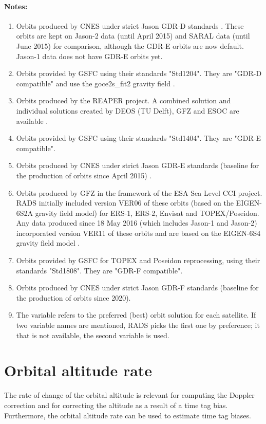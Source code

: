 \documentclass[a4paper,11pt,openany,natbib,nomargin]{thesis}
\newenvironment{notes}[1][Notes:]{\FloatBarrier\paragraph{#1}\begin{enumerate}}{\end{enumerate}}
\begin{document}
\begin{notes}
\item Orbits produced by CNES under strict Jason GDR-D standards \citep{ids2011}. These orbits are kept on Jason-2 data (until April 2015) and SARAL data (until June 2015) for comparison, although the GDR-E orbits are now default. Jason-1 data does not have GDR-E orbits yet.\label{item:alt_gdrd}
\item Orbits provided by GSFC using their standards "Std1204". They are "GDR-D compatible" and use the goce2s\_fit2 gravity field \citep{lemoine2013}.\label{item:alt_std1204}
\item Orbits produced by the REAPER project. A combined solution and individual solutions created by DEOS (TU Delft), GFZ and ESOC are available \citep{rudenko2011}.\label{item:alt_reaper}
\item Orbits provided by GSFC using their standards "Std1404". They are "GDR-E compatible".\label{item:alt_std1404}
\item Orbits produced by CNES under strict Jason GDR-E standards (baseline for the production of orbits since April 2015) \citep{ids2015}.\label{item:alt_gdre}
\item Orbits produced by GFZ in the framework of the ESA Sea Level CCI project. RADS initially included version VER06 of these orbits (based on the EIGEN-6S2A gravity field model) \citep{rudenko2014} for ERS-1, ERS-2, Envisat and TOPEX/Poseidon. Any data produced since 18 May 2016 (which includes Jason-1 and Jason-2) incorporated version VER11 of these orbits and are based on the EIGEN-6S4 gravity field model \citep{rudenko2015,rudenko2016}.\label{item:alt_slcci}
\item Orbits provided by GSFC for TOPEX and Poseidon reprocessing, using their standards "Std1808". They are "GDR-F compatible".\label{item:alt_std1808}
\item Orbits produced by CNES under strict Jason GDR-F standards (baseline for the production of orbits since 2020).\label{item:alt_gdrf}
\item The variable  refers to the preferred (best) orbit solution for each satellite. If two variable names are mentioned, RADS picks the first one by preference; it that is not available, the second variable is used.\label{item:alt}
\end{notes}

\section{Orbital altitude rate}
The rate of change of the orbital altitude is relevant for computing the Doppler correction and for correcting the altitude as a result of a time tag bias. Furthermore, the orbital altitude rate can be used to estimate time tag biases.
\end{document}
